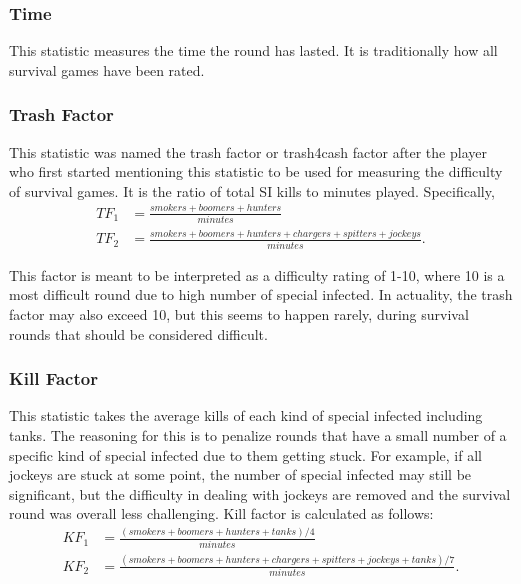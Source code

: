 \subsubsection{Time}
This statistic measures the time the round has lasted. It is traditionally how all survival games have been rated.

\subsubsection{Trash Factor}
This statistic was named the trash factor or trash4cash factor after the player who first started mentioning this statistic to be used for measuring the difficulty of survival games. It is the ratio of total SI kills to minutes played. Specifically,
\begin{align}
TF_{1} &= \frac{smokers + boomers + hunters}{minutes} \\
TF_{2} &= \frac{smokers + boomers + hunters + chargers + spitters + jockeys}{minutes} \text{.}
\end{align}

This factor is meant to be interpreted as a difficulty rating of 1-10, where 10 is a most difficult round due to high number of special infected. In actuality, the trash factor may also exceed 10, but this seems to happen rarely, during survival rounds that should be considered difficult.

\subsubsection{Kill Factor}
This statistic takes the average kills of each kind of special infected including tanks. The reasoning for this is to penalize rounds that have a small number of a specific kind of special infected due to them getting stuck. For example, if all jockeys are stuck at some point, the number of special infected may still be significant, but the difficulty in dealing with jockeys are removed and the survival round was overall less challenging. Kill factor is calculated as follows:
\begin{align}
KF_{1} &= \frac{(smokers + boomers + hunters + tanks) / 4}{minutes} \\
KF_{2} &= \frac{(smokers + boomers + hunters + chargers + spitters + jockeys + tanks) / 7}{minutes} \text{.}
\end{align}

